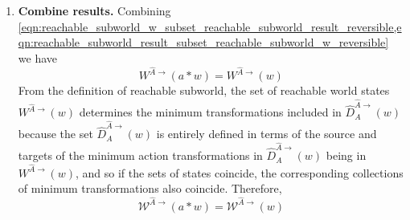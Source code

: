 \begin{proofE}
\begin{enumerate}[(1)]
    \item \textbf{Combine results.}
    Combining \cref{eqn:reachable_subworld_w_subset_reachable_subworld_result_reversible,eqn:reachable_subworld_result_subset_reachable_subworld_w_reversible} we have
    \begin{equation}
        W^{\hat{A}\to}(a \ast w) = W^{\hat{A}\to}(w)
    \end{equation}
    From the definition of reachable subworld, the set of reachable world states $W^{\hat{A}\to}(w)$ determines the minimum transformations included in $\hat{D}_{A}^{\hat{A}\to}(w)$ because the set $\hat{D}_{A}^{\hat{A}\to}(w)$ is entirely defined in terms of the source and targets of the minimum action transformations in $\hat{D}_{A}^{\hat{A}\to}(w)$ being in $W^{\hat{A}\to}(w)$, and so if the sets of states coincide, the corresponding collections of minimum transformations also coincide.
    Therefore,
    \begin{equation}
        \mathscr{W}^{\hat{A}\to}(a \ast w) = \mathscr{W}^{\hat{A}\to}(w)
    \end{equation}
\end{enumerate}
\end{proofE}

